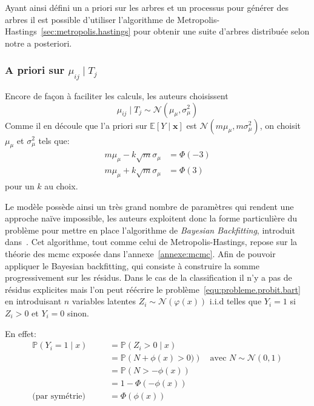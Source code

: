Ayant ainsi défini un a priori sur les arbres et un processus pour générer des arbres il est possible d'utiliser l'algorithme de Metropolis-Hastings~\ref{sec:metropolis.hastings} pour obtenir une suite d'arbres distribuée selon notre a posteriori.

\subsubsection{A priori sur $\mu_{ij} \mid T_j$}

Encore de façon à faciliter les calculs, les auteurs choisissent
\begin{equation*}
    \mu_{ij} \mid T_j \sim \mathcal{N} ( \mu_\mu , \sigma^2_\mu ) 
\end{equation*}
Comme il en découle que l'a priori sur $\mathbb{E} \left[ Y \mid \mathbf{x} \right]$ est $\mathcal{N} ( m \mu_\mu , m \sigma^2_\mu ) $, on choisit $\mu_\mu$ et $\sigma^2_\mu$ tels que:
\begin{align}
    m \mu_\mu - k \sqrt{m} \sigma_\mu &= \Phi ( -3 ) \\
    m \mu_\mu + k \sqrt{m} \sigma_\mu &= \Phi ( 3 )
\end{align}
pour un $k$ au choix.

Le modèle possède ainsi un très grand nombre de paramètres qui rendent une approche naïve impossible, les auteurs exploitent donc la forme particulière du problème pour mettre en place l'algorithme de \emph{Bayesian Backfitting}, introduit dans~\citet{Hastie2000}. Cet algorithme, tout comme celui de Metropolis-Hastings, repose sur la théorie des \ac{mcmc} exposée dans l'annexe~\ref{annexe:mcmc}. Afin de pouvoir appliquer le Bayesian backfitting, qui consiste à construire la somme progressivement sur les résidus. Dans le cas de la classification il n'y a pas de résidus explicites mais l'on peut réécrire le problème~\ref{equ:probleme.probit.bart} en introduisant $n$ variables latentes $Z_i \sim \mathcal{N} ( \varphi(x) )$ i.i.d telles que $Y_i = 1$ si $Z_i > 0$ et $Y_i = 0$ sinon.

En effet:
\begin{align*}
    \mathbb{P} \left( Y_i = 1 \mid x \right) &= \mathbb{P} \left( Z_i > 0 \mid x \right) \\
    &= \mathbb{P} \left( N + \phi(x) > 0 ) \right) \quad \text{avec } N \sim \mathcal{N} (0,1) \\
    &= \mathbb{P} \left( N > -\phi(x) \right) \\
    &= 1 - \Phi \left( - \phi(x) \right) \\
    \text{(par symétrie)} \qquad &= \Phi( \phi(x) )
\end{align*}


